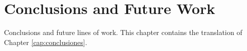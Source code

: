 \chapter*{Conclusions and Future Work}
\label{cap:conclusions}

Conclusions and future lines of work. This chapter contains the translation of Chapter \ref{cap:conclusiones}.


